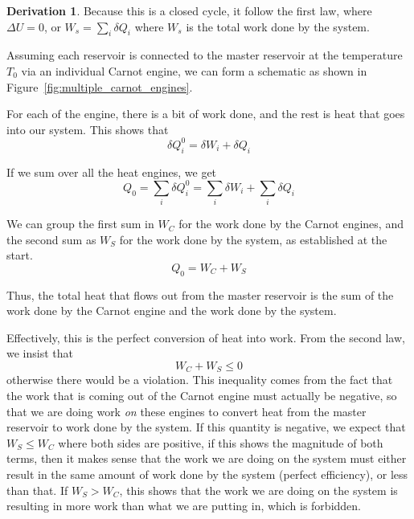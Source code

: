 \documentclass[12pt,chapterprefix=false,dvipsnames]{scrbook}
\theoremstyle{dotless}
\theoremstyle{definition}
\newtheorem{protoderivation}{Derivation}[section]
\newenvironment{derivation}
{\colorlet{shadecolor}{purple!15}\begin{shaded}\begin{protoderivation}}
			{\end{protoderivation}\end{shaded}}
\begin{document}
\begin{derivation}
	Because this is a closed cycle, it follow the first law, where
	$\Delta U = 0$, or $W_s = \sum_i \delta Q_i$ where
	$W_s$ is the total work done by the system.

	Assuming each reservoir is connected to the master reservoir at
	the temperature $T_0$ via an individual Carnot
	engine, we can form a schematic as shown in
	Figure~\ref{fig:multiple_carnot_engines}.

	For each of the engine, there is a bit of work done, and the
	rest is heat that goes into our system. This shows that
	\begin{equation}
		\delta Q^0_i = \delta W_i + \delta Q_i
	\end{equation}

	If we sum over all the heat engines, we get
	\begin{equation}
		Q_0 = \sum_i \delta Q_i^0 = \sum_i \delta W_i + \sum_i \delta
		Q_i
	\end{equation}

	We can group the first sum in $W_C$ for the
	work done by the Carnot engines, and the second sum as
	$W_S$ for the work done by the system, as
	established at the start.
	\begin{equation}
		Q_0 = W_C + W_S
	\end{equation}

	Thus, the total heat that flows out from the master reservoir is
	the sum of the work done by the Carnot engine and the work done
	by the system.

	Effectively, this is the perfect conversion of heat into work.
	From the second law, we insist that
	\begin{equation}
		W_C + W_S \leq 0
	\end{equation}
	otherwise there would be a violation. This inequality comes from
	the fact that the work that is coming out of the Carnot engine
	must actually be negative, so that we are doing work
	\textit{on} these engines to convert heat from the
	master reservoir to work done by the system. If this quantity is
	negative, we expect that $W_S \leq W_C$ where both sides
	are positive, if this shows the magnitude of both terms, then it
	makes sense that the work we are doing on the system must either
	result in the same amount of work done by the system (perfect
	efficiency), or less than that. If $W_S > W_C$, this
	shows that the work we are doing on the system is resulting in
	more work than what we are putting in, which is forbidden.


\end{derivation}
\end{document}
